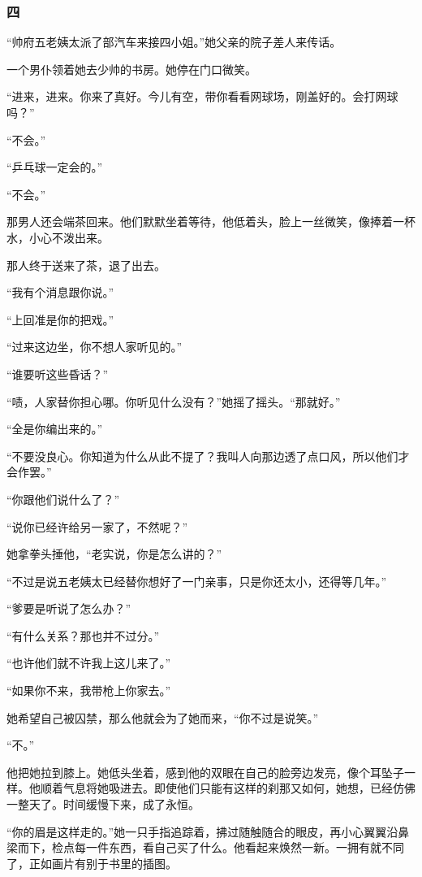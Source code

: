 \subsubsection*{四}


\par “帅府五老姨太派了部汽车来接四小姐。”她父亲的院子差人来传话。
\par 一个男仆领着她去少帅的书房。她停在门口微笑。
\par “进来，进来。你来了真好。今儿有空，带你看看网球场，刚盖好的。会打网球吗？”
\par “不会。”
\par “乒乓球一定会的。”
\par “不会。”
\par 那男人还会端茶回来。他们默默坐着等待，他低着头，脸上一丝微笑，像捧着一杯水，小心不泼出来。
\par 那人终于送来了茶，退了出去。
\par “我有个消息跟你说。”
\par “上回准是你的把戏。”
\par “过来这边坐，你不想人家听见的。”
\par “谁要听这些昏话？”
\par “啧，人家替你担心哪。你听见什么没有？”她摇了摇头。“那就好。”
\par “全是你编出来的。”
\par “不要没良心。你知道为什么从此不提了？我叫人向那边透了点口风，所以他们才会作罢。”
\par “你跟他们说什么了？”
\par “说你已经许给另一家了，不然呢？”
\par 她拿拳头捶他，“老实说，你是怎么讲的？”
\par “不过是说五老姨太已经替你想好了一门亲事，只是你还太小，还得等几年。”
\par “爹要是听说了怎么办？”
\par “有什么关系？那也并不过分。”
\par “也许他们就不许我上这儿来了。”
\par “如果你不来，我带枪上你家去。”
\par 她希望自己被囚禁，那么他就会为了她而来，“你不过是说笑。”
\par “不。”
\par 他把她拉到膝上。她低头坐着，感到他的双眼在自己的脸旁边发亮，像个耳坠子一样。他顺着气息将她吸进去。即使他们只能有这样的刹那又如何，她想，已经仿佛一整天了。时间缓慢下来，成了永恒。
\par “你的眉是这样走的。”她一只手指追踪着，拂过随触随合的眼皮，再小心翼翼沿鼻梁而下，检点每一件东西，看自己买了什么。他看起来焕然一新。一拥有就不同了，正如画片有别于书里的插图。

